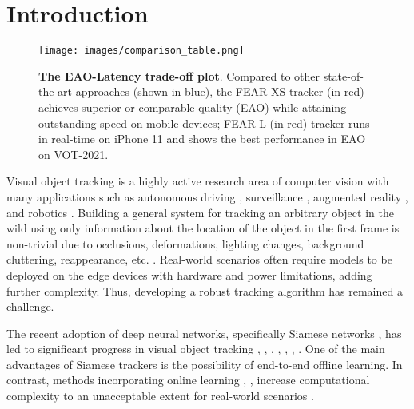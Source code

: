 \documentclass[runningheads]{llncs}
\begin{document}
\section{Introduction}

\begin{figure}[t]\centering
\begin{minipage}[c]{0.45\textwidth}
  \texttt{[image: images/comparison\_table.png]} 
\end{minipage}
\begin{minipage}[c]{0.54\textwidth}
   \caption{\textbf{The EAO-Latency trade-off plot}. Compared to other state-of-the-art approaches (shown in blue), the FEAR-XS tracker (in red) achieves superior or comparable quality (EAO) while attaining outstanding speed on mobile devices; FEAR-L (in red) tracker runs in real-time on iPhone 11 and shows the best performance in EAO on VOT-2021.}
\end{minipage}  
 \label{fig:cover}
\end{figure}

Visual object tracking is a highly active research area of computer vision with many applications such as autonomous driving \cite{autonomous}, surveillance \cite{surveillance}, augmented reality \cite{AR}, and robotics \cite{robotics}. 
Building a general system for tracking an arbitrary object in the wild using only information about the location of the object in the first frame is non-trivial due to occlusions, deformations, lighting changes, background cluttering, reappearance, etc. \cite{OTB}.
Real-world scenarios often require models to be deployed on the edge devices with hardware and power limitations, adding further complexity. 
Thus, developing a robust tracking algorithm has remained a challenge.

The recent adoption of deep neural networks, specifically Siamese networks \cite{Siam2015}, has led to significant progress in visual object tracking \cite{SiamFC}, \cite{SiamRPN}, \cite{SiamFC++}, \cite{SiamRPN++}, \cite{DaSiamRPN}, \cite{SiamDW}, \cite{Ocean}. 
One of the main advantages of Siamese trackers is the possibility of end-to-end offline learning. 
In contrast, methods incorporating online learning \cite{ATOM}, \cite{DiMP}, \cite{MDNet} increase computational complexity to an unacceptable extent for real-world scenarios \cite{survey2}. 
\end{document}
